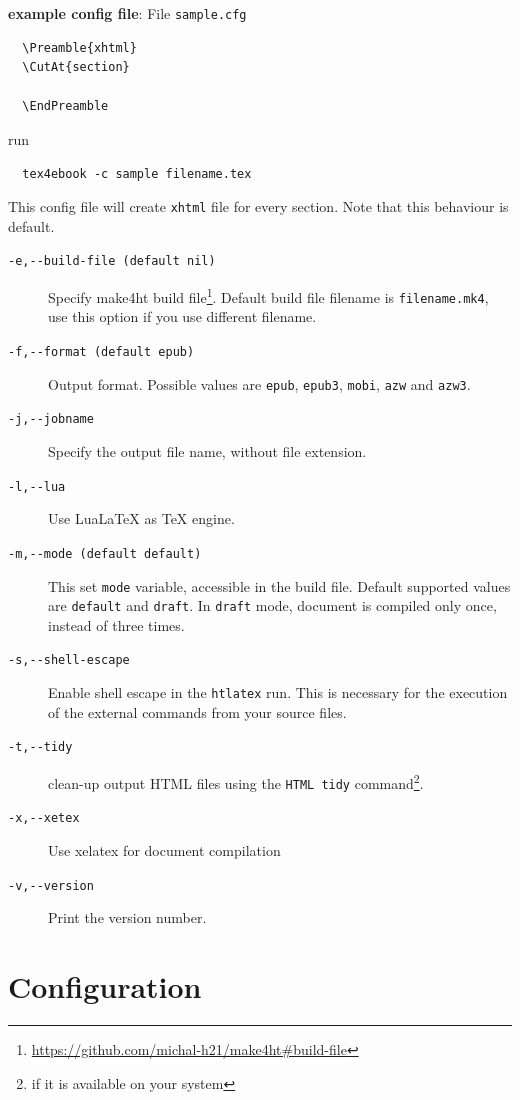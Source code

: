 \textbf{example config file}: File \texttt{sample.cfg}

\begin{verbatim}
  \Preamble{xhtml}
  \CutAt{section}
  
  \EndPreamble
\end{verbatim}

run

\begin{verbatim}
  tex4ebook -c sample filename.tex
\end{verbatim}

This config file will create \texttt{xhtml} file for every section. Note
that this behaviour is default.

\begin{description}
\item[\texttt{-e,-\/-build-file\ (default\ nil)}]
Specify make4ht build file\footnote{\url{https://github.com/michal-h21/make4ht\#build-file}}.
Default build file filename is \texttt{filename.mk4}, use this option if
you use different filename.
\item[\texttt{-f,-\/-format\ (default\ epub)}]
Output format. Possible values are \texttt{epub}, \texttt{epub3},
\texttt{mobi}, \texttt{azw} and \texttt{azw3}.
\item[\texttt{-j,-\/-jobname}]
Specify the output file name, without file extension.
\item[\texttt{-l,-\/-lua}]
Use LuaLaTeX as TeX engine.
\item[\texttt{-m,-\/-mode\ (default\ default)}]
This set \texttt{mode} variable, accessible in the build file. Default
supported values are \texttt{default} and \texttt{draft}. In
\texttt{draft} mode, document is compiled only once, instead of three
times.
\item[\texttt{-s,-\/-shell-escape}]
Enable shell escape in the \texttt{htlatex} run. This is necessary for
the execution of the external commands from your source files.
\item[\texttt{-t,-\/-tidy}]
clean-up output HTML files using the \texttt{HTML\ tidy}
command\footnote{if it is available on your system}.
\item[\texttt{-x,-\/-xetex}]
Use xelatex for document compilation
\item[\texttt{-v,-\/-version}]
Print the version number.
\end{description}

\section{Configuration}\label{configuration}

